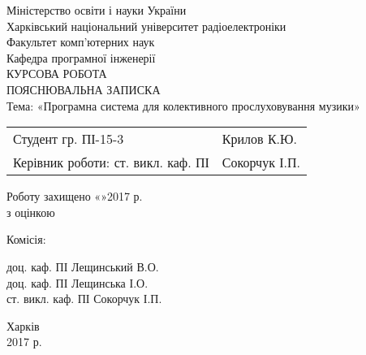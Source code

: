 \begin{center}
  Міністерство освіти і науки України \\
  Харківський національний університет радіоелектроніки \\
  \vspace*{\baselineskip}
  Факультет комп’ютерних наук \\
  \vspace*{\baselineskip}
  Кафедра програмної інженерії \\
  \vspace*{3\baselineskip}
  КУРСОВА РОБОТА \\
  ПОЯСНЮВАЛЬНА ЗАПИСКА \\
  Тема: «Програмна система для колективного прослуховування музики» \\
  \vspace*{3\baselineskip}
\end{center}

\begin{tabular}{ll}
  Студент гр. ПІ-15-3 & \uline{\hspace{7em}}Крилов К.Ю. \\
  Керівник роботи: ст. викл. каф. ПІ & \uline{\hspace{7em}}Сокорчук І.П.
\end{tabular}

\vspace*{\baselineskip}
\begin{adjustwidth}{14em}{}
  Роботу захищено «\uline{\hspace{2em}}»\uline{\hfill}2017 р. \\
  з оцінкою \uline{\hfill} \\
\end{adjustwidth}

Комісія:
\begin{adjustwidth}{14em}{}
  \begin{flushright}
    доц. каф. ПІ \uline{\hfill} Лещинський В.О. \\
    доц. каф. ПІ \uline{\hfill} Лещинська І.О. \\
    ст. викл. каф. ПІ \uline{\hfill} Сокорчук І.П.
  \end{flushright}
\end{adjustwidth}

\vspace*{2\baselineskip}

\begin{center}
  Харків \\
  2017 р.
\end{center}

\newpage
